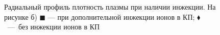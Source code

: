 \begin{figure}[h!]
	\begin{minipage}[h]{0.49\linewidth}
	\end{minipage}
	\hfill
	\begin{minipage}[h]{0.49\linewidth}
	\end{minipage}
	\caption{Радиальный профиль плотность плазмы при наличии инжекции. На рисунке б) $\blacksquare$ --- при дополнительной инжекции ионов в КП; $\blacklozenge$~---~без инжекции ионов в КП}
	\label{fig:density_r}
\end{figure}

